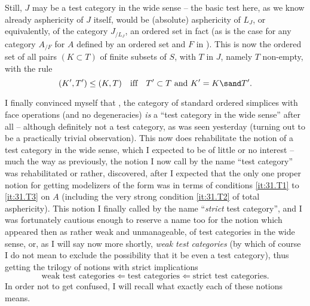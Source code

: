 Still, $J$ may be a test category in the wide sense -- the basic test
here, as we know already asphericity of $J$ itself, would be
(absolute) asphericity of $L_J$, or equivalently, of the category
$J_{/L_J}$, an ordered set in fact (as is the case for any category
$A_{/F}$ for $A$ defined by an ordered set and $F$ in \Ahat). This is
now the ordered set of all pairs $(K\subset T)$ of finite subsets of
$S$, with $T$ in $J$, namely $T$ non-empty, with the rule
\[ (K',T') \le (K,T) \quad\text{if{f}}\quad \text{$T'\subset T$ and
  $K'=K\sand T'$.}\]

\bigbreak

\presectionfill{}\par

\label{sec:44}%
\renewcommand*{\thesubsection}{\alph{subsection})}%
I finally convinced myself that \Simplexf, the category of standard
ordered simplices with face operations (and no degeneracies) \emph{is}
a ``test category in the wide sense'' after all -- although definitely
not a test category, as was seen yesterday (turning out to be a
practically trivial observation). This now does rehabilitate the
notion of a test category in the wide sense, which I expected to be of
little or no interest -- much the way as previously, the notion I now
call by the name ``test category'' was rehabilitated or rather,
discovered, after I expected that the only one proper notion for
getting modelizers of the form \Ahat{} was in terms of conditions
\ref{it:31.T1} to \ref{it:31.T3} on $A$ (including the very strong
condition \ref{it:31.T2} of total asphericity). This notion I finally
called by the name ``\emph{strict} test category'', and I was
fortunately cautious enough to reserve a name too for the notion which
appeared then as rather weak and unmanageable, of test categories in
the wide sense, or, as I will say now more shortly, \emph{weak test
  categories} (by which of course I do not mean to exclude the
possibility that it be even a test category), thus getting the trilogy
of notions with strict implications
\[\text{weak test categories} \Leftarrow \text{test categories}
\Leftarrow \text{strict test categories}.\]
In order not to get confused, I will recall what exactly each of these
notions means.

